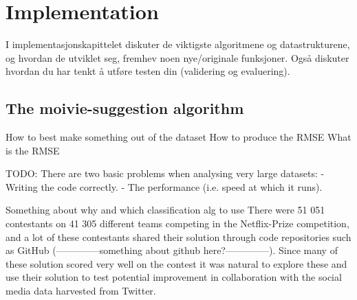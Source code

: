 
\chapter{Implementation}

\minitoc

I implementasjonskapittelet diskuter de viktigste algoritmene
og datastrukturene, og hvordan de utviklet seg, fremhev noen
nye/originale funksjoner. Også diskuter hvordan du har
tenkt å utføre testen din (validering og evaluering).

\clearpage

\section{The moivie-suggestion algorithm}


How to best make something out of the dataset
How to produce the RMSE
What is the RMSE


TODO:
There are two basic problems when analysing very large datasets:
    - Writing the code correctly.
    - The performance (i.e. speed at which it runs).



Something about why and which classification alg to use
There were 51 051 contestants on 41 305 different teams competing in the Netflix-Prize competition, and a lot of these contestants shared their solution through code repositories such as GitHub (--------------something about github here?--------------). Since many of these solution scored very well on the contest it was natural to explore these and use their solution to test potential improvement in collaboration with the social media data harvested from Twitter.

